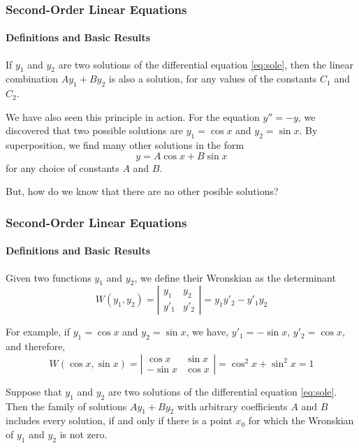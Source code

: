 \documentclass[9pt,xcolor=x11names,compress]{beamer}
\begin{document}
\begin{frame}\frametitle{Second-Order Linear Equations}
\framesubtitle{Definitions and Basic Results}
\begin{theorem}
	If $y_1$ and $y_2$ are two solutions of the differential equation \eqref{eq:sole}, then the linear combination $Ay_1+By_2$ is also a solution, for any values of the constants $C_1$ and $C_2$.	
\end{theorem}
We have also seen this principle in action.  For the equation $y''=-y$, we discovered that two possible solutions are $y_1=\cos x$ and $y_2=\sin x$.  By superposition, we find many other solutions in the form
\begin{equation*}
	y=A\cos x + B\sin x
\end{equation*}
for any choice of constants $A$ and $B$.

\vspace{1cm}
\pause But, \alert{how do we know that there are no other posible solutions?}

\vspace{1cm}
\end{frame}

\begin{frame}\frametitle{Second-Order Linear Equations}
\framesubtitle{Definitions and Basic Results}
\begin{definition}
	Given two functions $y_1$ and $y_2$, we define their \alert{Wronskian} as the determinant
	\begin{equation*}
		W(y_1,y_2) = \left| \begin{matrix} y_1 & y_2 \\ y'_1 & y'_2 \end{matrix} \right|=y_1 y'_2 - y'_1y_2
	\end{equation*}
\end{definition}
For example, if $y_1=\cos x$ and $y_2=\sin x$, we have, $y'_1=-\sin x$, $y'_2=\cos x$, and therefore,
\begin{equation*}
	W(\cos x,\sin x) = \left| \begin{matrix} \cos x & \sin x \\ -\sin x & \cos x \end{matrix} \right|= \cos^2 x + \sin^2 x = 1
\end{equation*}
\pause
\begin{theorem}
	Suppose that $y_1$ and $y_2$ are two solutions of the differential equation \eqref{eq:sole}.  Then the family of solutions $Ay_1+By_2$ with arbitrary coefficients $A$ and $B$ includes \alert{every solution}, if and only if there is a point $x_0$ for which the Wronskian of $y_1$ and $y_2$ is not zero.
\end{theorem}
\end{frame}
\end{document}
